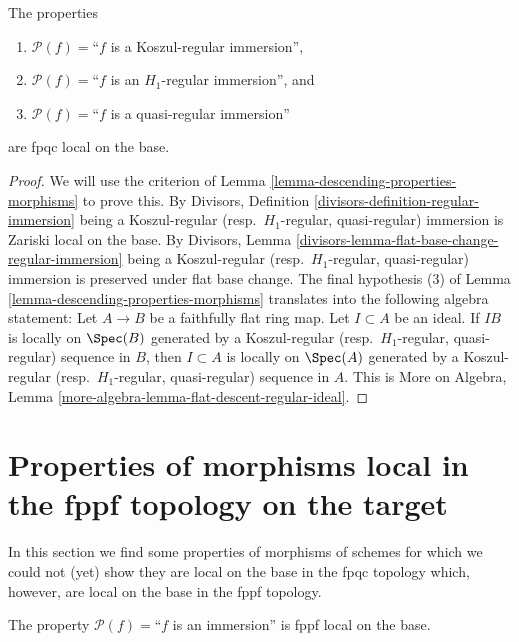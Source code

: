 \begin{lemma}
\label{lemma-descending-property-regular-immersion}
The properties
\begin{enumerate}
\item[] $\mathcal{P}(f) =$``$f$ is a Koszul-regular immersion'',
\item[] $\mathcal{P}(f) =$``$f$ is an $H_1$-regular immersion'', and
\item[] $\mathcal{P}(f) =$``$f$ is a quasi-regular immersion''
\end{enumerate}
are fpqc local on the base.
\end{lemma}

\begin{proof}
We will use the criterion of
Lemma \ref{lemma-descending-properties-morphisms}
to prove this. By
Divisors, Definition \ref{divisors-definition-regular-immersion}
being a Koszul-regular (resp.\ $H_1$-regular, quasi-regular)
immersion is Zariski local on the base. By
Divisors, Lemma \ref{divisors-lemma-flat-base-change-regular-immersion}
being a Koszul-regular (resp.\ $H_1$-regular, quasi-regular)
immersion is preserved under flat base change.
The final hypothesis (3) of
Lemma \ref{lemma-descending-properties-morphisms}
translates into the following algebra statement:
Let $A \to B$ be a faithfully flat ring map. Let $I \subset A$ be an ideal.
If $IB$ is locally on $\Spec(B)$ generated by a Koszul-regular
(resp.\ $H_1$-regular, quasi-regular) sequence in $B$, then $I \subset A$
is locally on $\Spec(A)$ generated by a Koszul-regular
(resp.\ $H_1$-regular, quasi-regular) sequence in $A$. This is
More on Algebra, Lemma \ref{more-algebra-lemma-flat-descent-regular-ideal}.
\end{proof}





\section{Properties of morphisms local in the fppf topology on the target}
\label{section-descending-properties-morphisms-fppf}

\noindent
In this section we find some properties of morphisms of schemes
for which we could not (yet) show they are local on the base in
the fpqc topology which, however, are local on the base
in the fppf topology.

\begin{lemma}
\label{lemma-descending-fppf-property-immersion}
The property $\mathcal{P}(f) =$``$f$ is an immersion''
is fppf local on the base.
\end{lemma}

